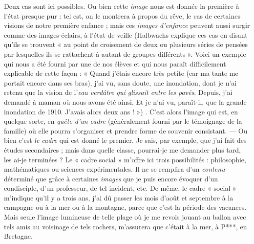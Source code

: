 \vspace{0.24cm}
{\footnotesize 
Deux cas sont ici possibles. Ou bien cette {\it image} nous est donnée la première
à l’état presque pur : tel est, on le montrera à propos du rêve, le
cas de certaines visions de notre première enfance ; mais ces {\it images d'enfance}
peuvent aussi surgir comme des images-éclairs, à l’état de veille
{\scriptsize (Halbwachs explique ces cas en disant qu'ils se trouvent « au point de croisement
de deux ou plusieurs séries de pensées par lesquelles ils se rattachent à autant de
groupes différents ». Voici un exemple qui nous a été fourni par une de nos élèves et
qui nous paraît difficilement explicable de cette façon : « Quand j'étais encore très petite
(car ma tante me portait encore dans ses bras), j'ai vu, sans doute, une inondation,
dont je n’ai retenu que la vision de l’{\it eau verdâtre qui glissait entre les pavés}. Depuis, j'ai
demandé à maman où nous avons été ainsi. Et je n’ai vu, paraît-il, que la grande
inondation de 1910. J'avais alors deux ans ! »)}
. C'est
alors l’image qui est, en quelque sorte, en {\it quête d'un cadre} (généralement
fourni par le témoignage de la famille) où elle pourra s'organiser et prendre
forme de souvenir consistant. — Ou bien c’est {\it le cadre} qui est donné le
premier. Je sais, par exemple, que j'ai fait des études secondaires ; mais
dans quelle classe, pourrai-je me demander plus tard, les ai-je terminées ?
Le « cadre social » m'offre ici trois possibilités : philosophie, mathématiques
ou sciences expérimentales. Il ne se remplira d’un {\it contenu} déterminé que
grâce à certaines {\it images} que je puis encore évoquer d’un condisciple, d’un
professeur, de tel incident, etc. De même, le cadre « social » m'indique qu'il
y a trois ans, j'ai dû passer les mois d'août et septembre à la campagne
ou à la mer ou à la montagne, parce que c’est la période des vacances.
Mais seule l’image lumineuse de telle plage où je me revois jouant au ballon
avec tels amis au voisinage de tels rochers, m'assurera que c'était à la mer,
à P***, en Bretagne.}
\vspace{0.31cm}

